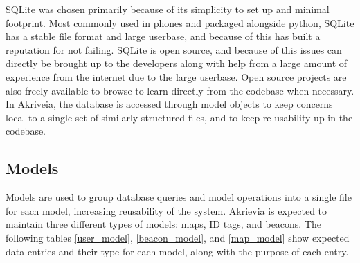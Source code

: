 \bigskip
SQLite was chosen primarily because of its simplicity to set up and minimal footprint.
Most commonly used in phones and packaged alongside python, SQLite has a stable file format and large userbase, and because of this has built a reputation for not failing.
SQLite is open source, and because of this issues can directly be brought up to the developers along with help from a large amount of experience from the internet due to the large userbase.
Open source projects are also freely available to browse to learn directly from the codebase when necessary.
In Akriveia, the database is accessed through model objects to keep concerns local to a single set of similarly structured files, and to keep re-usability up in the codebase.

\medskip
\subsection{Models}
\medskip
Models are used to group database queries and model operations into a single file for each model, increasing reusability of the system.
Akrievia is expected to maintain three different types of models: maps, ID tags, and beacons. The following tables \ref{user_model}, \ref{beacon_model}, and \ref{map_model} show expected data entries and their type for each model, along with the purpose of each entry.

